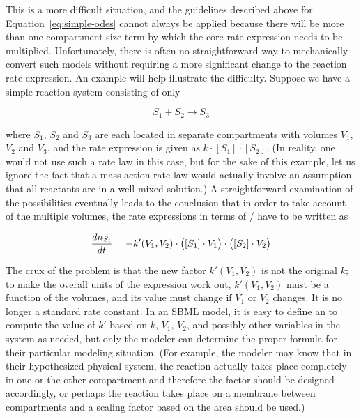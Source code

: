 This is a more difficult situation, and the guidelines described
above for Equation~\eqref{eq:simple-odes} cannot always be applied
because there will be more than one compartment size term by which
the core rate expression needs to be multiplied.  Unfortunately,
there is often no straightforward way to mechanically convert such
models without requiring a more significant change to the reaction
rate expression.  An example will help illustrate the difficulty.
Suppose we have a simple reaction system consisting of only
\begin{linenomath}
\begin{equation*}
  S_1 + S_2 \rightarrow S_3
\end{equation*}
\end{linenomath}
where $S_1$, $S_2$ and $S_3$ are each located in separate
compartments with volumes $V_1$, $V_2$ and $V_3$, and the rate
expression is given as $k \cdot [S_1] \cdot [S_2]$.  (In reality,
one would not use such a rate law in this case, but for the sake
of this example, let us ignore the fact that a mass-action rate
law would actually involve an assumption that all reactants are in
a well-mixed solution.)  A straightforward examination of the
possibilities eventually leads to the conclusion that in order to
take account of the multiple volumes, the rate expressions in
terms of / have to be written
as
\begin{linenomath}
\begin{equation*}
  \frac{dn_{S_i}}{dt} = -k'(V_1,V_2) \cdot 
    \bigl([S_1] \cdot V_1\bigr) \cdot \bigl([S_2] \cdot V_2\bigr)\\
\end{equation*}
\end{linenomath}
The crux of the problem is that the new factor $k'(V_1,V_2)$ is
not the original $k$; to make the overall units of the expression
work out, $k'(V_1,V_2)$ must be a function of the volumes, and its
value must change if $V_1$ or $V_2$ changes.  It is no longer a
standard rate constant.  In an SBML model, it is easy to define an
\AssignmentRule to compute the value of $k'$ based on $k$, $V_1$,
$V_2$, and possibly other variables in the system as needed, but
only the modeler can determine the proper formula for their
particular modeling situation.  (For example, the modeler may know
that in their hypothesized physical system, the reaction actually
takes place completely in one or the other compartment and
therefore the factor should be designed accordingly, or perhaps
the reaction takes place on a membrane between compartments and a
scaling factor based on the area should be used.)

